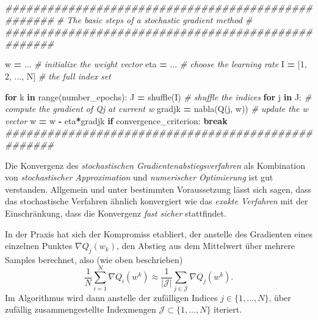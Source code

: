 \documentclass[
]{book}
\newenvironment{Shaded}{\begin{snugshade}}{\end{snugshade}}
\newcommand{\BuiltInTok}[1]{#1}
\newcommand{\CommentTok}[1]{\textcolor[rgb]{0.56,0.35,0.01}{\textit{#1}}}
\newcommand{\ControlFlowTok}[1]{\textcolor[rgb]{0.13,0.29,0.53}{\textbf{#1}}}
\newcommand{\DecValTok}[1]{\textcolor[rgb]{0.00,0.00,0.81}{#1}}
\newcommand{\KeywordTok}[1]{\textcolor[rgb]{0.13,0.29,0.53}{\textbf{#1}}}
\newcommand{\NormalTok}[1]{#1}
\newcommand{\OperatorTok}[1]{\textcolor[rgb]{0.81,0.36,0.00}{\textbf{#1}}}
\theoremstyle{definition}
\theoremstyle{definition}
\theoremstyle{definition}
\theoremstyle{definition}
\theoremstyle{remark}
\begin{document}
\begin{Shaded}
\begin{Highlighting}[]
\CommentTok{\#\#\#\#\#\#\#\#\#\#\#\#\#\#\#\#\#\#\#\#\#\#\#\#\#\#\#\#\#\#\#\#\#\#\#\#\#\#\#\#\#\#\#\#\#\#\#\#\#\#\#}
\CommentTok{\# The basic steps of a stochastic gradient method \#}
\CommentTok{\#\#\#\#\#\#\#\#\#\#\#\#\#\#\#\#\#\#\#\#\#\#\#\#\#\#\#\#\#\#\#\#\#\#\#\#\#\#\#\#\#\#\#\#\#\#\#\#\#\#\#}

\NormalTok{w }\OperatorTok{=}\NormalTok{ ...  }\CommentTok{\# initialize the weight vector}
\NormalTok{eta }\OperatorTok{=}\NormalTok{ ... }\CommentTok{\# choose the learning rate}
\NormalTok{I }\OperatorTok{=}\NormalTok{ [}\DecValTok{1}\NormalTok{, }\DecValTok{2}\NormalTok{, ..., N]  }\CommentTok{\# the full index set}

\ControlFlowTok{for}\NormalTok{ k }\KeywordTok{in} \BuiltInTok{range}\NormalTok{(number\_epochs):}
\NormalTok{    J }\OperatorTok{=}\NormalTok{ shuffle(I)  }\CommentTok{\# shuffle the indices}
    \ControlFlowTok{for}\NormalTok{ j }\KeywordTok{in}\NormalTok{ J:}
        \CommentTok{\# compute the gradient of Qj at current w}
\NormalTok{        gradjk }\OperatorTok{=}\NormalTok{ nabla(Q(j, w))  }
        \CommentTok{\# update the w vector}
\NormalTok{        w }\OperatorTok{=}\NormalTok{ w }\OperatorTok{{-}}\NormalTok{ eta}\OperatorTok{*}\NormalTok{gradjk}
    \ControlFlowTok{if}\NormalTok{ convergence\_criterion:}
       \ControlFlowTok{break}
\CommentTok{\#\#\#\#\#\#\#\#\#\#\#\#\#\#\#\#\#\#\#\#\#\#\#\#\#\#\#\#\#\#\#\#\#\#\#\#\#\#\#\#\#\#\#\#\#\#\#\#\#\#\#}
\end{Highlighting}
\end{Shaded}

Die Konvergenz des \emph{stochastischen Gradientenabstiegsverfahren} als Kombination von \emph{stochastischer Approximation} und \emph{numerischer Optimierung} ist gut verstanden. Allgemein und unter bestimmten Voraussetzung lässt sich sagen, dass das stochastische Verfahren ähnlich konvergiert wie das \emph{exakte Verfahren} mit der Einschränkung, dass die Konvergenz \emph{fast sicher} stattfindet.

In der Praxis hat sich der Kompromiss etabliert, der anstelle des Gradienten eines einzelnen Punktes \(\nabla Q_j(w_k)\), den Abstieg aus dem Mittelwert über mehrere Samples berechnet, also (wie oben beschrieben)
\begin{equation*}
\frac{1}{N} \sum_{i=1}^N \nabla Q_i(w^k) \approx \frac{1}{|\mathcal J|} \sum_{j\in \mathcal J} \nabla Q_j(w^k).
\end{equation*}
Im Algorithmus wird dann anstelle der zufälligen Indices \(j \in \{1, \dotsc, N\}\), über zufällig zusammengestellte Indexmengen \(\mathcal J \subset \{1, \dotsc, N\}\) iteriert.
\end{document}
